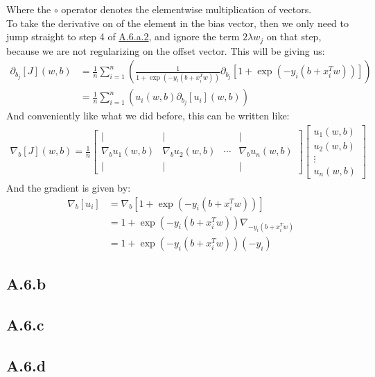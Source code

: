 \documentclass[]{article}
\begin{document}
        Where the $\circ$ operator denotes the elementwise multiplication of vectors. 
        \\
        To take the derivative on of the element in the bias vector, then we only need to jump straight to step 4 of \hyperref[eqn:A.6.a.2]{A.6.a.2}, and ignore the term $2\lambda w_j$ on that step, because we are not regularizing on the offset vector. This will be giving us: 
        \begin{align*}\tag{A.6.a.4}\label{eqn:A.6.a.4}
            \partial_{b_j}[J](w, b) 
            &= 
            \frac{1}{n} \sum_{i = 1}^{n}
            \left(
                \frac{1}{1 + \exp(-y_i(b + x^T_iw))}
                \partial_{b_j}
                \left[
                    1 + \exp(-y_i(b + x^T_iw))
                \right]
            \right)
            \\
            &= 
            \frac{1}{n} \sum_{i = 1}^{n}
            \left(
                u_i(w, b)
                \partial_{b_j}
                \left[
                    u_i
                \right](w, b)
            \right)
        \end{align*}
        And conveniently like what we did before, this can be written like: 
        \begin{align*}\tag{A.6.a.5}\label{eqn:A.6.a.5}
            \nabla_b[J](w, b) = 
            \frac{1}{n} \begin{bmatrix}
                | & | &  &|
                \\
                \nabla_b u_1(w, b) & \nabla_b u_2(w, b) & \cdots& \nabla_b u_n(w, b)
                \\
                | & | &  &|
             \end{bmatrix}
             \begin{bmatrix}
                 u_1(w, b) \\ 
                 u_2(w, b) \\
                 \vdots
                 \\
                 u_n(w, b)
             \end{bmatrix}
        \end{align*}
        And the gradient is given by: 
        \begin{align*}\tag{A.6.a.6}\label{eqn:A.6.a.6}
            \nabla_b[u_i] &= \nabla_b[1 + \exp(-y_i(b + x_i^Tw))]
            \\
            &= 1 + \exp(-y_i(b + x_i^Tw))\nabla_{-y_i(b + x_i^Tw)}
            \\
            &= 1 + \exp(-y_i(b + x_i^Tw))(-y_i)
        \end{align*}
    \subsection*{A.6.b}
    \subsection*{A.6.c}
    \subsection*{A.6.d}
\end{document}

